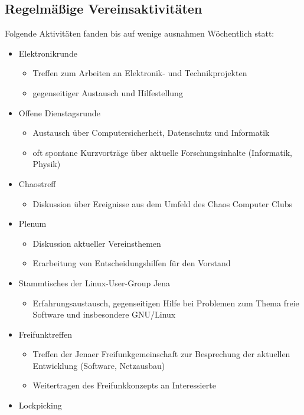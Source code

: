 \documentclass[10pt, a4paper]{scrartcl}
\begin{document}
\subsection*{Regelmäßige Vereinsaktivitäten}
Folgende Aktivitäten fanden bis auf wenige ausnahmen Wöchentlich statt:
\begin{itemize}
	\item Elektronikrunde
		\begin{itemize}
		    \item Treffen zum Arbeiten an Elektronik- und Technikprojekten
		    \item gegenseitiger Austausch und Hilfestellung
		\end{itemize}
	\item Offene Dienstagsrunde
		\begin{itemize}
			\item Austausch über Computersicherheit, Datenschutz und Informatik
			\item oft spontane Kurzvorträge über aktuelle Forschungsinhalte (Informatik, Physik)
		\end{itemize}
	\item Chaostreff
		\begin{itemize}
			\item Diskussion über Ereignisse aus dem Umfeld des Chaos Computer Clubs
		\end{itemize}
	\item Plenum
		\begin{itemize}
			\item Diskussion aktueller Vereinsthemen
			\item Erarbeitung von Entscheidungshilfen für den Vorstand
		\end{itemize}
	\item Stammtisches der Linux-User-Group Jena
		\begin{itemize}
			\item Erfahrungsaustausch, gegenseitigen Hilfe bei Problemen zum Thema freie Software und insbesondere GNU/Linux
		\end{itemize}
	\item Freifunktreffen
		\begin{itemize}
		    \item Treffen der Jenaer Freifunkgemeinschaft zur Besprechung der aktuellen Entwicklung (Software, Netzausbau)
		    \item Weitertragen des Freifunkkonzepts an Interessierte
		\end{itemize}
	\item Lockpicking

\end{itemize}
\end{document}
